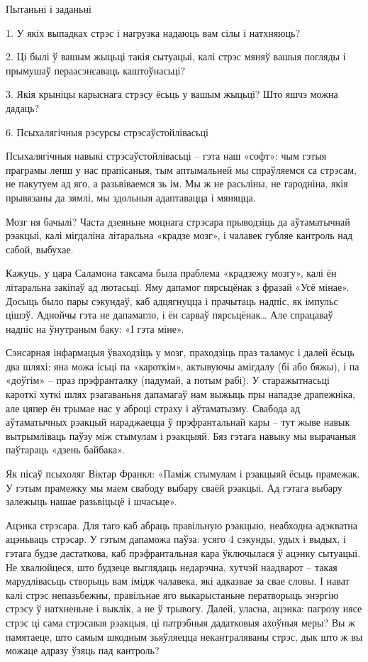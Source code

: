 Пытаньні і заданьні

1. У якіх выпадках стрэс і нагрузка надаюць вам сілы і натхняюць?

2. Ці былі ў вашым жыцьці такія сытуацыі, калі стрэс мяняў вашыя погляды і прымушаў пераасэнсаваць каштоўнасьці?

3. Якія крыніцы карыснага стрэсу ёсьць у вашым жыцьці? Што яшчэ можна дадаць?


6. Псыхалягічныя рэсурсы стрэсаўстойлівасьці

Псыхалягічныя навыкі стрэсаўстойлівасьці – гэта наш «софт»: чым гэтыя праграмы лепш у нас прапісаныя, тым аптымальней мы спраўляемся са стрэсам, не пакутуем ад яго, а разьвіваемся зь ім. Мы ж не расьліны, не гародніна, якія прывязаны да зямлі, мы здольныя адаптавацца і мяняцца.

Мозг ня бачылі? Часта дзеяньне моцнага стрэсара прыводзіць да аўтаматычнай рэакцыі, калі мігдаліна літаральна «крадзе мозг», і чалавек губляе кантроль над сабой, выбухае.

Кажуць, у цара Саламона таксама была праблема «крадзежу мозгу», калі ён літаральна закіпаў ад лютасьці. Яму дапамог пярсьцёнак з фразай «Усё мінае». Досыць было пары сэкундаў, каб адцягнуцца і прачытаць надпіс, як імпульс цішэў. Аднойчы гэта не дапамагло, і ён сарваў пярсьцёнак… Але спрацаваў надпіс на ўнутраным баку: «І гэта міне».

Сэнсарная інфармацыя ўваходзіць у мозг, праходзіць праз таламус і далей ёсьць два шляхі: яна можа ісьці па «кароткім», актывуючы амігдалу (бі або бяжы), і па «доўгім» – праз прэфранталку (падумай, а потым рабі). У старажытнасьці кароткі хуткі шлях рэагаваньня дапамагаў нам выжыць пры нападзе драпежніка, але цяпер ён трымае нас у аброці страху і аўтаматызму. Свабода ад аўтаматычных рэакцый нараджаецца ў прэфрантальнай кары – тут жыве навык вытрымліваць паўзу між стымулам і рэакцыяй. Бяз гэтага навыку мы вырачаныя паўтараць «дзень байбака».

Як пісаў псыхоляг Віктар Франкл: «Паміж стымулам і рэакцыяй ёсьць прамежак. У гэтым прамежку мы маем свабоду выбару сваёй рэакцыі. Ад гэтага выбару залежыць нашае разьвіцьцё і шчасьце».

Ацэнка стрэсара. Для таго каб абраць правільную рэакцыю, неабходна адэкватна ацэньваць стрэсар. У гэтым дапаможа паўза: усяго 4 сэкунды, удых і выдых, і гэтага будзе дастаткова, каб прэфрантальная кара ўключылася ў ацэнку сытуацыі. Не хвалюйцеся, што будзеце выглядаць недарэчна, хутчэй наадварот – такая марудлівасьць створыць вам імідж чалавека, які адказвае за свае словы. І нават калі стрэс непазьбежны, правільнае яго выкарыстаньне ператворыць энэргію стрэсу ў натхненьне і выклік, а не ў трывогу. Далей, уласна, ацэнка: пагрозу нясе стрэс ці сама стрэсавая рэакцыя, ці патрэбныя дадатковыя ахоўныя меры? Вы ж памятаеце, што самым шкодным зьяўляецца некантраляваны стрэс, дык што ж вы можаце адразу ўзяць пад кантроль?

